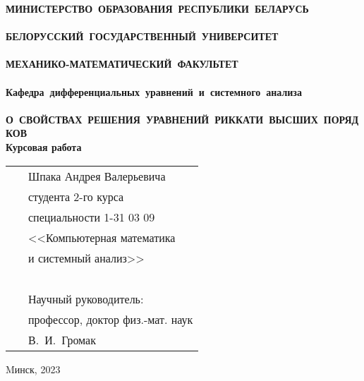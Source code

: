 \setcounter{page}{1}
\thispagestyle{empty}
\begin{center}
\bf
\vspace{4cm}
{
\mbox{МИНИСТЕРСТВО~ОБРАЗОВАНИЯ~РЕСПУБЛИКИ~БЕЛАРУСЬ} \\~\\
\mbox{БЕЛОРУССКИЙ~ГОСУДАРСТВЕННЫЙ~УНИВЕРСИТЕТ} \\~\\
\mbox{МЕХАНИКО-МАТЕМАТИЧЕСКИЙ~ФАКУЛЬТЕТ} \\~\\
\mbox{Кафедра~дифференциальных~уравнений~и~системного~анализа} \\~\\
}
\vspace{4cm}
\bf
\mbox{О СВОЙСТВАХ РЕШЕНИЯ УРАВНЕНИЙ РИККАТИ ВЫСШИХ ПОРЯДКОВ}\\
\vspace{1cm}
\rm Курсовая работа 
\vspace{3cm}
\end{center}
\begin{tabular}{ll}
\hspace{10.5cm}
&Шпака Андрея Валерьевича~\\
&студента 2-го курса\\
&специальности 1-31 03 09\\
&<<Компьютерная математика\\
&и системный анализ>>\\~\\
&Научный руководитель:\\
&профессор, доктор физ.-мат. наук\\
&В.~И.~Громак
\end{tabular}
\vspace{3cm}
\begin{center}
Mинск, 2023
\end{center}
\clearpage
\restoregeometry